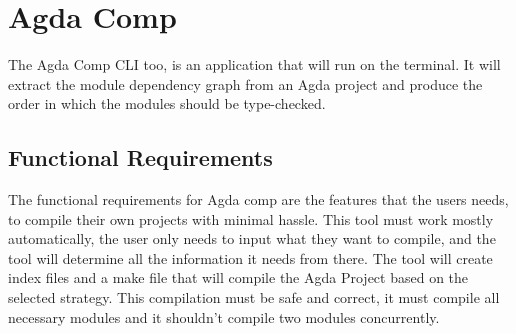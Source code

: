 \section{Agda Comp}

The Agda Comp CLI too, is an application that will run on the terminal. It will
extract the module dependency graph from an Agda project and produce the order
in which the modules should be type-checked.

\subsection{Functional Requirements}

\begin{minipage}{\linewidth\fboxsep\fboxrule}

The functional requirements for Agda comp are the features that the users
needs, to compile their own projects with minimal hassle. This tool must work
mostly automatically, the user only needs to input what they want to compile, and the tool will determine all the information it needs from there. The tool
will create index files and a make file that will compile the Agda Project
based on the selected strategy. This compilation must be safe and correct, it
must compile all necessary modules and it shouldn't compile two modules
concurrently.


\end{minipage}
